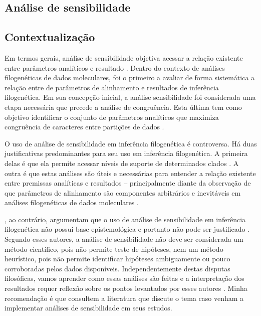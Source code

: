 \begin{refsection}
\section{Análise de sensibilidade}\label{tut10:sa}

\subsection{Contextualização}\label{tut10:sa:context}

Em termos gerais, análise de sensibilidade objetiva acessar a relação existente entre parâmetros analíticos e resultado \parencite{Saltelli_2000}. Dentro do contexto de análises filogenéticas de dados moleculares, \textcite{Wheeler_1995} foi o primeiro a avaliar de forma sistemática a relação entre de parâmetros de alinhamento e resultados de inferência filogenética. Em sua concepção inicial, a análise sensibilidade foi considerada uma etapa necessária que precede a análise de congruência. Esta última tem como objetivo identificar o conjunto de parâmetros analíticos que maximiza congruência de caracteres entre partições de dados \parencite[veja][]{Wheeler_1995,Wheeler_and_Hayashi_1998, Ramirez_2006}.

O uso de análise de sensibilidade em inferência filogenética é controversa. Há duas justificativas predominantes para seu uso em inferência filogenética. A primeira delas é que ela permite acessar níveis de suporte de determinados clados \parencite[\textit{e.g.},][]{Wheeler_and_Hayashi_1998,Giribet_2003}. A outra é que estas análises são úteis e necessárias para entender a relação existente entre premissas analíticas e resultados -- principalmente diante da observação de que parâmetros de alinhamento são componentes arbitrários e inevitáveis em análises filogenéticas de dados moleculares \parencite[veja][]{Giribet_and_Wheeler_2007}.

\textcite{Grant_and_Kluge_2003}, ao contrário, argumentam que o uso de análise de sensibilidade em inferência filogenética não possui base epistemológica e portanto não pode ser justificado \parencite[veja resposta em][]{Giribet_and_Wheeler_2007}. Segundo esses autores, a análise de sensibilidade não deve ser considerada um método científico, pois não permite teste de hipóteses, nem um método heurístico, pois não permite identificar hipóteses ambiguamente ou pouco corroboradas pelos dados disponíveis. Independentemente destas disputas filosóficas, vamos aprender como essas análises são feitas e a interpretação dos resultados requer reflexão sobre os pontos levantados por esses autores \parencite{Grant_and_Kluge_2003,Giribet_and_Wheeler_2007}. Minha recomendação é que consultem a literatura que discute o tema caso venham a implementar análises de sensibilidade em seus estudos.


\end{refsection}
